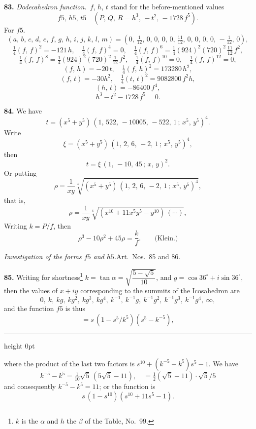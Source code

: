 \documentclass[11pt,a4paper]{article}
\newcommand{\artno}[1]{\textbf{#1.}\quad}
\begin{document}
\artno{83} \textit{Dodecahedron function.}\ $f$, $h$, $t$ stand for the
before-mentioned values
\[
  f5,\,h5,\,t5\quad(P,\,Q,\,R = h^{3},\,-t^{2},\,-1728\,f^{5}).
\]
For $f5$.
\[
  (a,\,b,\,c,\,d,\,e,\,f,\,g,\,h,\,i,\,j,\,k,\,l,\,m)
   = (0,\,\tfrac{1}{12},\,0,\,0,\,0,\,0,\,\tfrac{11}{12},\,0,\,0,\,0,\,0,\,-\tfrac{1}{12},\,0),
\]
\[
  \tfrac{1}{4}(f,\,f)^{2} = -121\,h,\quad
  \tfrac{1}{4}(f,\,f)^{4} = 0,\quad
  \tfrac{1}{4}(f,\,f)^{6} = \tfrac{1}{4}(924)^{2}(720)^{2}\,\tfrac{11}{12}\,f^{2},
\]
\[
  \tfrac{1}{4}(f,\,f)^{8} = \tfrac{1}{4}(924)^{2}(720)^{2}\,\tfrac{1}{12}\,f^{2},\quad
  \tfrac{1}{4}(f,\,f)^{10} = 0,\quad
  \tfrac{1}{4}(f,\,f)^{12} = 0,
\]
\[
  (f,\,h) = -20\,t,\quad
  \tfrac{1}{4}(f,\,h)^{2} = 173280\,h^{2},
\]
\[
  (f,\,t) = -30 h^{2},\quad
  \tfrac{1}{4}(t,\,t)^{2} = 9082800\,f^{2} h,
\]
\[
  (h,\,t) = -86400\,f^{4},
\]
\[
  h^{3} - t^{2} - 1728\,f^{5} = 0.
\]

\artno{84} We have
\[
  t = (x^{5} + y^{5})\,(1,\,522,\,-10005,\,-522,\,1\,;\,x^{5},\,y^{5})^{4}.
\]
Write
\[
  \xi = (x^{5} + y^{5})\,(1,\,2,\,6,\,-2,\,1\,;\,x^{5},\,y^{5})^{4},
\]
then
\[
  t = \xi\,(1,\,-10,\,45\,;\,x,\,y)^{2}.
\]
Or putting
\[
  \rho = \frac{1}{x y}\sqrt[4]{(x^{5} + y^{5})\,(1,\,2,\,6,\,-2,\,1
                                                  \,;\,x^{5},\,y^{5})^{4}},
\]
that is,
\[
  \rho = \frac{1}{x y}\sqrt[4]{(x^{10} + 11 x^{5} y^{5} - y^{10})\,(\dotsb)},
\]
Writing $k = P/f$, then
\[
  \rho^{3} - 10 \rho^{2} + 45\rho = \dfrac{k}{f}.\qquad\text{(Klein.)}
\]

\smallskip
\begin{center}
\textit{Investigation of the forms $f5$ and $h5$.}\quad Art.\ Nos.\ 85 and 86.
\end{center}

\artno{85} Writing for shortness\footnote{$k$ is the $\alpha$ and $h$ the
$\beta$ of the Table, No.~99.}
$k = \tan\alpha = \sqrt{\dfrac{5 - \sqrt{5}}{10}}$, and
$g = \cos 36^{\circ} + i\sin 36^{\circ}$, then the values of $x + iy$
corresponding to the summits of the Icosahedron are
\[
  0,\ k,\ k g,\ k g^{2},\ k g^{3},\ k g^{4},\ k^{-1},\ k^{-1} g,\
  k^{-1} g^{2},\ k^{-1} g^{3},\ k^{-1} g^{4},\ \infty,
\]
and the function $f5$ is thus
\[
  = s\,(1 - s^{5}/k^{5})(s^{5} - k^{-5}),
\]

\bigskip
\hrule height 0pt
\bigskip

\noindent
where the product of the last two factors is $s^{10} + (k^{-5} - k^{5})s^{5} - 1$.
We have
\[
  k^{-5} - k^{5} = \tfrac{1}{10}\sqrt{5}\,(5\sqrt{5} - 11),
   \quad = \tfrac{1}{2}(\sqrt{5} - 11)\cdot\sqrt{5}/5
\]
and consequently $k^{-5} - k^{5} = 11$; or the function is
\[
  s\,(1 - s^{10})(s^{10} + 11 s^{5} - 1).
\]
\end{document}
